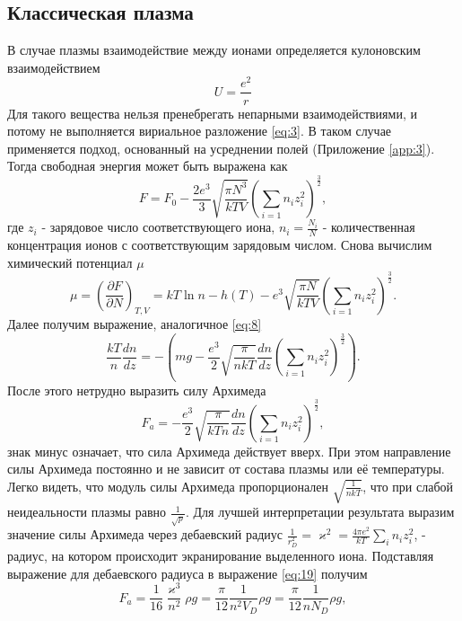 \documentclass[12pt]{article}
\begin{document}
\subsection*{Классическая плазма}
В случае плазмы взаимодействие между ионами определяется кулоновским взаимодействием 
\[
    U = \frac{e^2}{r}
\] 
Для такого вещества нельзя пренебрегать непарными взаимодействиями, и потому не выполняется вириальное
разложение \ref{eq:3}. В таком случае применяется подход, основанный на усреднении полей (Приложение \ref{app:3}). 
Тогда свободная энергия может быть выражена как 
\begin{equation}
    F = F_0 - \frac{2e^3}{3} \sqrt{\frac{\pi N^3}{kTV}}\left( \sum_{i=1} n_i z_i^2 \right)^\frac{3}{2}, 
    \label{eq:16}
\end{equation}
где $z_i$ - зарядовое число соответствующего иона, $n_i = \frac{N_i}{N}$ - количественная концентрация 
ионов с соответствующим зарядовым числом. Снова вычислим химический потенциал $\mu$
\begin{equation}
    \mu = \left( \frac{\partial F}{\partial N} \right)_{T, V} = kT \ln n - h(T) - e^3 \sqrt{\frac{\pi N}{kTV}}\left( \sum_{i=1} n_i z_i^2 \right)^\frac{3}{2}.
    \label{eq:17}
\end{equation}   
Далее получим выражение, аналогичное \ref{eq:8}
\begin{equation}
    \frac{kT}{n} \frac{dn}{dz} = -\left( mg - \frac{e^3}{2} \sqrt{\frac{\pi}{nkT}} \frac{dn}{dz} \left( \sum_{i=1} n_i z_i^2 \right)^\frac{3}{2} \right).
    \label{eq:18}
\end{equation}
После этого нетрудно выразить силу Архимеда
\begin{equation}
    F_a = -\frac{e^3}{2} \sqrt{\frac{\pi}{kTn}} \frac{dn}{dz} \left( \sum_{i=1} n_i z_i^2 \right)^\frac{3}{2},
    \label{eq:19}
\end{equation}
знак минус означает, что сила Архимеда действует вверх. При этом направление силы Архимеда постоянно и не зависит от 
состава плазмы или её температуры. Легко видеть, что модуль силы Архимеда пропорционален $\sqrt{\frac{1}{nkT}}$, 
что при слабой неидеальности плазмы равно $\frac{1}{\sqrt{p}}$. 
Для лучшей интерпретации результата выразим значение силы Архимеда через дебаевский радиус $\frac{1}{r_D^2} = \varkappa^2 = \frac{4\pi e^2}{kT} \sum_{i} n_i z_i^2 $, - 
радиус, на котором происходит экранирование выделенного иона. Подставляя выражение для дебаевского радиуса в выражение \ref{eq:19} получим 
\begin{equation}
    F_a = \frac{1}{16} \frac{\varkappa^3}{n^2} \rho g = \frac{\pi}{12} \frac{1}{n^2 V_D} \rho g = 
    \frac{\pi}{12} \frac{1}{n N_D} \rho g,
    \label{eq:20}
\end{equation}
\end{document}
